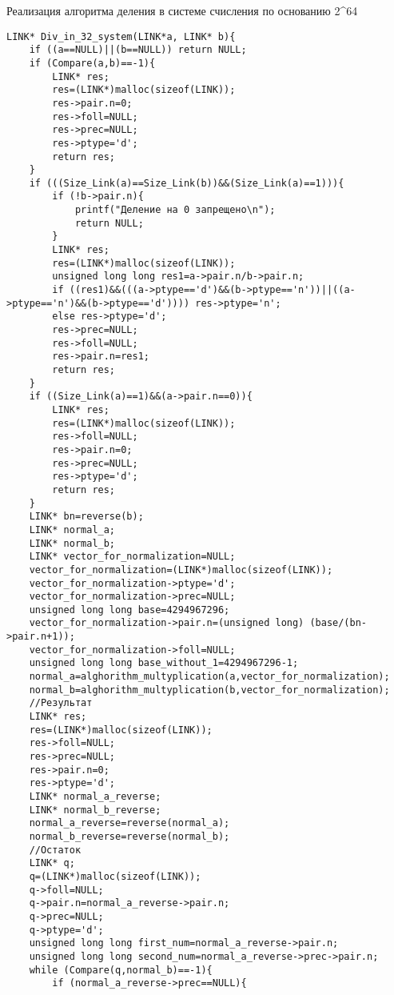 \documentclass[14pt, russian]{scrartcl}
\begin{document}
\newpage
\begin{code}
\caption{Реализация алгоритма деления в системе счисления по основанию 2^{64}}
\label{lst:octaladd}
\begin{verbatim}
LINK* Div_in_32_system(LINK*a, LINK* b){
    if ((a==NULL)||(b==NULL)) return NULL;
    if (Compare(a,b)==-1){
        LINK* res;
        res=(LINK*)malloc(sizeof(LINK));
        res->pair.n=0;
        res->foll=NULL;
        res->prec=NULL;
        res->ptype='d';
        return res;
    }
    if (((Size_Link(a)==Size_Link(b))&&(Size_Link(a)==1))){
        if (!b->pair.n){
            printf("Деление на 0 запрещено\n");
            return NULL;
        }
        LINK* res;
        res=(LINK*)malloc(sizeof(LINK));
        unsigned long long res1=a->pair.n/b->pair.n;
        if ((res1)&&(((a->ptype=='d')&&(b->ptype=='n'))||((a->ptype=='n')&&(b->ptype=='d')))) res->ptype='n';
        else res->ptype='d';
        res->prec=NULL;
        res->foll=NULL;
        res->pair.n=res1;
        return res;
    }
    if ((Size_Link(a)==1)&&(a->pair.n==0)){
        LINK* res;
        res=(LINK*)malloc(sizeof(LINK));
        res->foll=NULL;
        res->pair.n=0;
        res->prec=NULL;
        res->ptype='d';
        return res;
    }
    LINK* bn=reverse(b);
    LINK* normal_a;
    LINK* normal_b;
    LINK* vector_for_normalization=NULL;
    vector_for_normalization=(LINK*)malloc(sizeof(LINK));
    vector_for_normalization->ptype='d';
    vector_for_normalization->prec=NULL;
    unsigned long long base=4294967296;
    vector_for_normalization->pair.n=(unsigned long) (base/(bn->pair.n+1));
    vector_for_normalization->foll=NULL;
    unsigned long long base_without_1=4294967296-1;
    normal_a=alghorithm_multyplication(a,vector_for_normalization);
    normal_b=alghorithm_multyplication(b,vector_for_normalization);
    //Результат
    LINK* res;
    res=(LINK*)malloc(sizeof(LINK));
    res->foll=NULL;
    res->prec=NULL;
    res->pair.n=0;
    res->ptype='d';
    LINK* normal_a_reverse;
    LINK* normal_b_reverse;
    normal_a_reverse=reverse(normal_a);
    normal_b_reverse=reverse(normal_b);
    //Остаток
    LINK* q;
    q=(LINK*)malloc(sizeof(LINK));        
    q->foll=NULL;
    q->pair.n=normal_a_reverse->pair.n;
    q->prec=NULL;
    q->ptype='d';
    unsigned long long first_num=normal_a_reverse->pair.n;
    unsigned long long second_num=normal_a_reverse->prec->pair.n;
    while (Compare(q,normal_b)==-1){
        if (normal_a_reverse->prec==NULL){

\end{verbatim}
\end{code}
\end{document}
